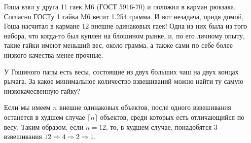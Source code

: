 Гоша взял у друга 11 гаек M6 (ГОСТ 5916-70) и положил в карман рюкзака. Согласно ГОСТу 1  гайка M6 весит 1.254 грамма. И вот незадача, придя домой, Гоша насчитал в кармане 12  внешне одинаковых гаек! Одна из них была из того набора, что когда-то был куплен на блошином рынке, и, по его личному опыту, такие гайки имеют меньший вес, около грамма, а также сами по себе более низкого качества менее прочные. 

У Гошиного папы есть весы, состоящие из двух больших чаш на двух концах рычага. За какое минимальное количество взвешиваний можно найти ту самую низкокачесвенную гайку?

\solutionSection

Если мы имеем $n$ внешне одинаковых объектов, после одного взвешивания останется в худшем случае $\lceil n \rceil$ объектов, среди которых есть отличающийся по весу. Таким образом, если $n = 12$, то, в худшем случае, понадобятся 3 взвешивания $12\Rightarrow 4\Rightarrow 2\Rightarrow 1$.


